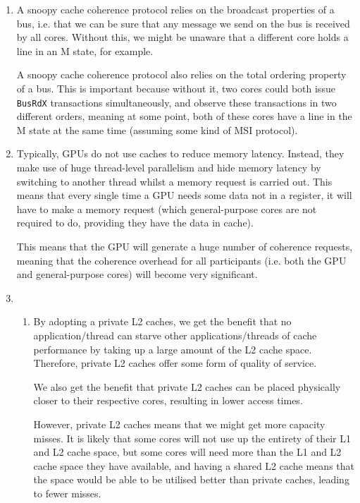 


\begin{enumerate}[label=(\alph*)]
    \item
        A snoopy cache coherence protocol relies on the broadcast properties of a bus, i.e. that we can be sure that any message we send on the bus is received by all cores. Without this, we might be unaware that a different core holds a line in an M state, for example.

        A snoopy cache coherence protocol also relies on the total ordering property of a bus. This is important because without it, two cores could both issue \texttt{BusRdX} transactions simultaneously, and observe these transactions in two different orders, meaning at some point, both of these cores have a line in the M state at the same time (assuming some kind of MSI protocol).

    \item
        Typically, GPUs do not use caches to reduce memory latency. Instead, they make use of huge thread-level parallelism and hide memory latency by switching to another thread whilst a memory request is carried out. This means that every single time a GPU needs some data not in a register, it will have to make a memory request (which general-purpose cores are not required to do, providing they have the data in cache).

        This means that the GPU will generate a huge number of coherence requests, meaning that the coherence overhead for all participants (i.e. both the GPU and general-purpose cores) will become very significant.

    \item
        \begin{enumerate}[label=(\roman*)]
            \item

                By adopting a private L2 caches, we get the benefit that no application/thread can starve other applications/threads of cache performance by taking up a large amount of the L2 cache space. Therefore, private L2 caches offer some form of quality of service.

                We also get the benefit that private L2 caches can be placed physically closer to their respective cores, resulting in lower access times.

                However, private L2 caches means that we might get more capacity misses. It is likely that some cores will not use up the entirety of their L1 and L2 cache space, but some cores will need more than the L1 and L2 cache space they have available, and having a shared L2 cache means that the space would be able to be utilised  better than private caches, leading to fewer misses.


\end{enumerate}
\end{enumerate}
